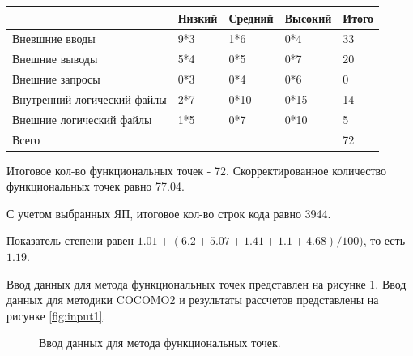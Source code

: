 \documentclass[a4paper,14pt]{article}
\begin{document}
\begin{table}[H]
\begin{tabular}{|l|l|l|l|l|}
\hline
                            & Низкий & Средний                  & Высокий                  & Итого \\ \hline
Вневшние вводы              & 9*3    & 1*6                      & 0*4                      & 33    \\ \hline
Внешние выводы              & 5*4    & 0*5                      & 0*7                      & 20    \\ \hline
Внешние запросы             & 0*3    & {0*4} & {0*6} & 0     \\ \hline
Внутренний логический файлы & 2*7    & 0*10                     & 0*15                     & 14    \\ \hline
Внешние логический файлы    & 1*5    & 0*7                      & 0*10                     & 5    \\ \hline
Всего    &     &                      &                    & 72    \\ \hline
\end{tabular}
\end{table}

Итоговое кол-во функциональных точек - 72. Скорректированное количество функциональных точек равно 77.04.

С учетом выбранных ЯП, итоговое кол-во строк кода равно 3944.

Показатель степени равен $1.01 + (6.2+5.07+1.41+1.1+4.68) / 100)$, то есть $1.19$.

Ввод данных для метода функциональных точек представлен на рисунке \ref{fig:fp_set}. Ввод данных для методики COCOMO2 и результаты рассчетов представлены на рисунке \ref{fig:input1}. 

\newpage
\begin{figure}[!h]
         \caption{Ввод данных для метода функциональных точек.}
    \label{fig:fp_set}
\end{figure}
\end{document}
